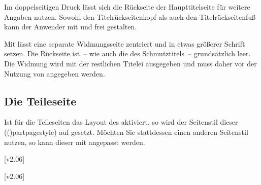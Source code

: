 \begin{DeclareEntity*}{}
\begin{DeclareEntity*}{}
\begin{DeclareEntity*}{}
\begin{Entity}{}
\begin{Declaration}
\begin{Declaration}
\begin{Declaration}
\begin{Declaration}
\begin{Declaration}
\begin{Declaration}
\begin{Declaration}
\begin{Declaration}
%
Im doppelseitigen Druck lässt sich die Rückseite der Haupttitelseite für 
weitere Angaben nutzen. Sowohl den Titelrückseitenkopf als auch den
Titelrückseitenfuß kann der Anwender mit  und 
 frei gestalten.

Mit  lässt eine separate Widmungsseite zentriert und in etwas 
größerer Schrift setzen. Die Rückseite ist~-- wie auch die des Schmutztitels~-- 
grundsätzlich leer. Die Widmung wird mit der restlichen Titelei ausgegeben und 
muss daher vor der Nutzung von  angegeben werden.
\end{Declaration}
\end{Declaration}
\end{Declaration}
\end{Declaration}
\end{Declaration}
\end{Declaration}
\end{Declaration}
\end{Declaration}
%
\end{Entity}



\subsection{%
  Die Teileseite%
  \label{sec:part}%
}

%
Ist für die Teileseiten das Layout des \CDs aktiviert, so wird der Seitenstil 
dieser (\Macro(){partpagestyle}) auf 
 gesetzt. Möchten Sie stattdessen einen anderen 
Seitenstil nutzen, so kann dieser mit 
angepasst werden.

\begin{Declaration}
  {}
  [v2.06]
\begin{Declaration}
  {}
  [v2.06]
\printdeclarationlist[Schriftelemente]


\end{Declaration}
\end{Declaration}
\end{DeclareEntity*}
\end{DeclareEntity*}
\end{DeclareEntity*}
